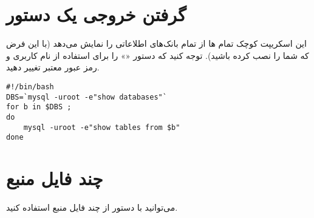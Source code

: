 \section*{گرفتن خروجی یک دستور}
این اسکریپت کوچک تمام ها از تمام بانک‌های اطلاعاتی را نمایش می‌دهد (با این
فرض که شما  را نصب کرده‌ باشید). توجه کنید که دستور «» را برای استفاده
از نام کاربری و رمز عبور معتبر تغییر دهید.
\begin{latin}
\begin{lstlisting}
#!/bin/bash
DBS=`mysql -uroot -e"show databases"`
for b in $DBS ;
do
	mysql -uroot -e"show tables from $b"
done
\end{lstlisting}
\end{latin}

\section*{چند فایل‌ منبع}

می‌توانید با دستور  از چند فایل‌ منبع استفاده کنید.

